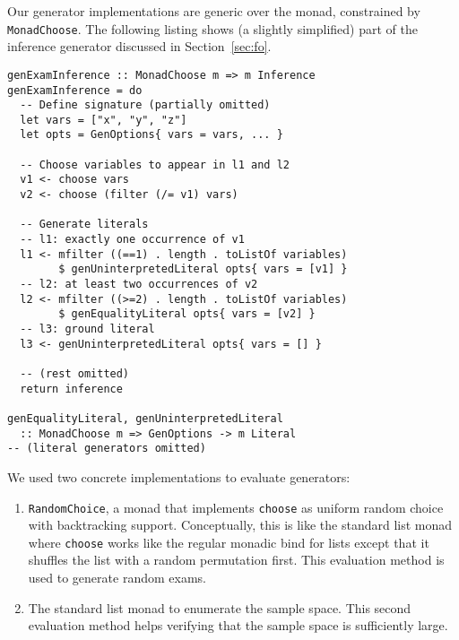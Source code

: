 Our generator implementations are generic over the monad, constrained by \texttt{MonadChoose}.
The following listing shows (a slightly simplified) part of the inference generator
discussed in Section~\ref{sec:fo}.
\begin{lstlisting}
genExamInference :: MonadChoose m => m Inference
genExamInference = do
  -- Define signature (partially omitted)
  let vars = ["x", "y", "z"]
  let opts = GenOptions{ vars = vars, ... }

  -- Choose variables to appear in l1 and l2
  v1 <- choose vars
  v2 <- choose (filter (/= v1) vars)

  -- Generate literals
  -- l1: exactly one occurrence of v1
  l1 <- mfilter ((==1) . length . toListOf variables)
        $ genUninterpretedLiteral opts{ vars = [v1] }
  -- l2: at least two occurrences of v2
  l2 <- mfilter ((>=2) . length . toListOf variables)
        $ genEqualityLiteral opts{ vars = [v2] }
  -- l3: ground literal
  l3 <- genUninterpretedLiteral opts{ vars = [] }

  -- (rest omitted)
  return inference

genEqualityLiteral, genUninterpretedLiteral
  :: MonadChoose m => GenOptions -> m Literal
-- (literal generators omitted)
\end{lstlisting}

We used two concrete implementations to evaluate generators:
\begin{enumerate}
    \item
        \texttt{RandomChoice}, a monad that implements \texttt{choose}
        as uniform random choice with backtracking support.
        Conceptually, this is like the standard list monad
        where \texttt{choose} works like the regular monadic bind for lists
        except that it shuffles the list with a random permutation first.
        This evaluation method is used to generate random exams.
    \item
        The standard list monad to enumerate the sample space.
        This second evaluation method helps verifying that the sample space is sufficiently large.
\end{enumerate}

